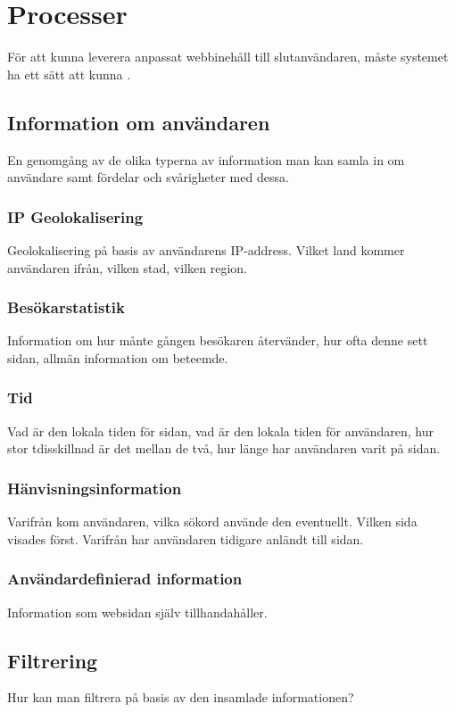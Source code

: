 \section{Processer}

För att kunna leverera anpassat webbinehåll till slutanvändaren, måste systemet ha ett sätt att kunna .

\subsection{Information om användaren}

En genomgång av de olika typerna av information man kan samla in om användare samt fördelar och svårigheter med dessa.

\subsubsection{IP Geolokalisering}

Geolokalisering på basis av användarens IP-address. Vilket land kommer användaren ifrån, vilken stad, vilken region.

\subsubsection{Besökarstatistik}

Information om hur månte gången besökaren återvänder, hur ofta denne sett sidan, allmän information om beteemde.

\subsubsection{Tid}

Vad är den lokala tiden för sidan, vad är den lokala tiden för användaren, hur stor tdisskillnad är det mellan de två, hur länge har användaren varit på sidan.

\subsubsection{Hänvisningsinformation}

Varifrån kom användaren, vilka sökord använde den eventuellt. Vilken sida visades först. Varifrån har användaren tidigare anländt till sidan.

\subsubsection{Användardefinierad information}

Information som websidan själv tillhandahåller.

\subsection{Filtrering}

Hur kan man filtrera på basis av den insamlade informationen?


